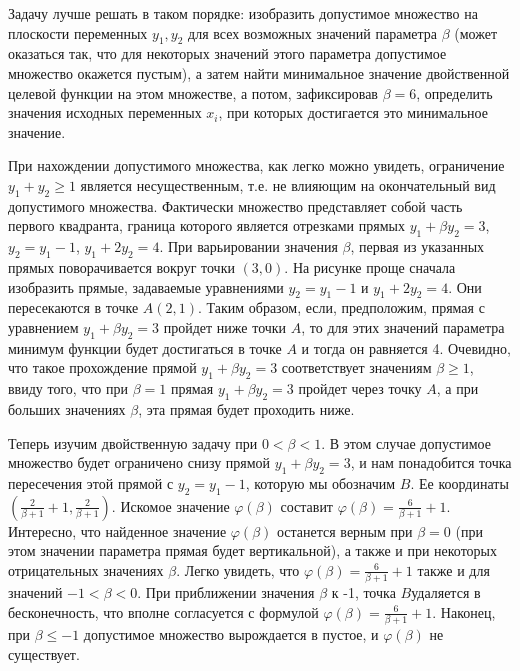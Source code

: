 \begin{solution}
Задачу лучше решать в таком порядке: изобразить допустимое множество на плоскости переменных $y_{1} ,y_{2} $ для всех возможных значений параметра $\beta $ (может оказаться так, что для некоторых значений этого параметра допустимое множество окажется пустым), а затем найти минимальное значение двойственной целевой функции на этом множестве, а потом, зафиксировав $\beta =6$, определить значения исходных переменных $x_{i} $, при которых достигается это минимальное значение.

При нахождении допустимого множества, как легко можно увидеть, ограничение $y_{1} +y_{2} \ge 1$ является несущественным, т.е. не влияющим на окончательный вид допустимого множества. Фактически множество представляет собой часть первого квадранта, граница которого является отрезками прямых $y_{1} +\beta y_{2} =3$, $y_{2} =y_{1} -1$, $y_{1} +2y_{2} =4$. При варьировании значения $\beta $, первая из указанных прямых поворачивается вокруг точки $(3,0)$. На рисунке проще сначала изобразить прямые, задаваемые уравнениями $y_{2} =y_{1} -1$ и $y_{1} +2y_{2} =4$. Они пересекаются в точке $A(2,1)$. Таким образом, если, предположим, прямая с уравнением  $y_{1} +\beta y_{2} =3$ пройдет ниже точки $A$, то для этих значений параметра минимум функции будет достигаться в точке $A$ и тогда он равняется 4. Очевидно, что такое прохождение прямой $y_{1} +\beta y_{2} =3$ соответствует значениям $\beta \ge 1$, ввиду того, что при $\beta =1$ прямая $y_{1} +\beta y_{2} =3$ пройдет через точку $A$, а при больших значениях $\beta $, эта прямая будет проходить ниже.

Теперь изучим двойственную задачу при $0<\beta <1$. В этом случае допустимое множество будет ограничено снизу прямой $y_{1} +\beta y_{2} =3$, и нам понадобится точка пересечения этой прямой с $y_{2} =y_{1} -1$, которую мы обозначим $B$. Ее координаты $\left(\frac{2}{\beta +1} +1,\frac{2}{\beta +1} \right)$. Искомое значение $\varphi (\beta )$ составит $\varphi (\beta )=\frac{6}{\beta +1} +1$. Интересно, что найденное значение $\varphi (\beta )$ останется верным при $\beta =0$ (при этом значении параметра прямая будет вертикальной), а также и при некоторых отрицательных значениях $\beta $. Легко увидеть, что $\varphi (\beta )=\frac{6}{\beta +1} +1$ также и для значений $-1<\beta <0$. При приближении значения $\beta $ к -1, точка $B$удаляется в бесконечность, что вполне согласуется с формулой $\varphi (\beta )=\frac{6}{\beta +1} +1$. Наконец, при $\beta \le -1$ допустимое множество вырождается в пустое, и $\varphi (\beta )$ не существует.


\end{solution}
